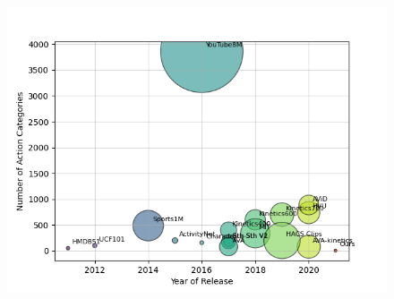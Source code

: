 \begin{frame}

    \begin{minipage}{0.45\textwidth}
         \centering
         \begin{figure}
            \includegraphics[width=\linewidth]{../../assets/figures/popular-datasets.png}
            \label{figure:popular-datasets-visualization}
            \cite{video-action-recognition-study}
         \end{figure}
     \end{minipage}
     \hfill
     \begin{minipage}{0.45\textwidth}
        \centering
            
            \label{table:popular-datasets-overview}
            \cite{video-action-recognition-study}
     \end{minipage}
 \end{frame}